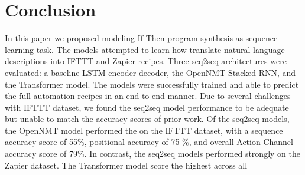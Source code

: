 \documentclass[letterpaper]{article} %
\begin{document}
\section{Conclusion}
In this paper we proposed modeling If-Then program synthesis as sequence learning task. The models attempted to learn how translate natural language descriptions into IFTTT and Zapier recipes. Three seq2seq architectures were evaluated: a baseline LSTM encoder-decoder, the OpenNMT Stacked RNN, and the Transformer model. The models were successfully trained and able to predict the full automation recipes in an end-to-end manner. Due to several challenges with IFTTT dataset, we found the seq2seq model performance to be adequate but unable to match the accuracy scores of prior work. Of the seq2seq models, the OpenNMT model performed the on the IFTTT dataset, with a sequence accuracy score of 55\%, positional accuracy of 75 \%, and overall Action Channel accuracy score of 79\%. In contrast, the seq2seq models performed strongly on the Zapier dataset. The Transformer model score the highest across all


\clearpage

\end{document}
